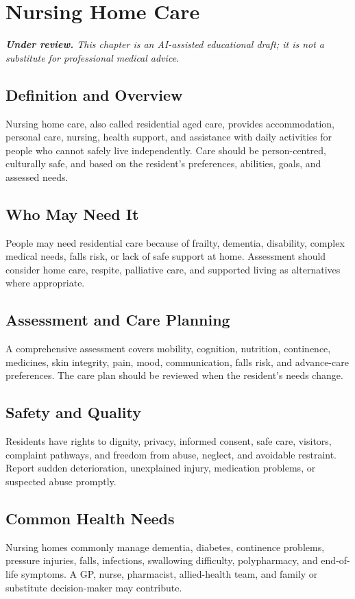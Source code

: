 \chapter{Nursing Home Care}

\medskip
\noindent\textit{\textbf{Under review.} This chapter is an AI-assisted educational draft; it is not a substitute for professional medical advice.}

\section*{Definition and Overview}
Nursing home care, also called residential aged care, provides accommodation, personal care, nursing, health support, and assistance with daily activities for people who cannot safely live independently. Care should be person-centred, culturally safe, and based on the resident's preferences, abilities, goals, and assessed needs.

\section*{Who May Need It}
People may need residential care because of frailty, dementia, disability, complex medical needs, falls risk, or lack of safe support at home. Assessment should consider home care, respite, palliative care, and supported living as alternatives where appropriate.

\section*{Assessment and Care Planning}
A comprehensive assessment covers mobility, cognition, nutrition, continence, medicines, skin integrity, pain, mood, communication, falls risk, and advance-care preferences. The care plan should be reviewed when the resident's needs change.

\section*{Safety and Quality}
Residents have rights to dignity, privacy, informed consent, safe care, visitors, complaint pathways, and freedom from abuse, neglect, and avoidable restraint. Report sudden deterioration, unexplained injury, medication problems, or suspected abuse promptly.

\section*{Common Health Needs}
Nursing homes commonly manage dementia, diabetes, continence problems, pressure injuries, falls, infections, swallowing difficulty, polypharmacy, and end-of-life symptoms. A GP, nurse, pharmacist, allied-health team, and family or substitute decision-maker may contribute.

